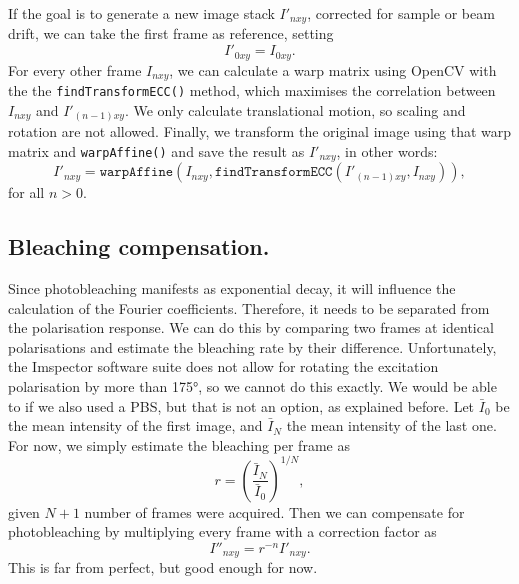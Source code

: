 If the goal is to generate a new image stack $ I'_{nxy} $, corrected for sample or beam drift, we can take the first frame as reference, setting 
\begin{equation}
	I'_{0xy} = I_{0xy}.
\end{equation}
For every other frame $ I_{nxy} $, we can calculate a warp matrix using OpenCV with the the \texttt{findTransformECC()} method, which maximises the correlation between $ I_{nxy} $ and $ I'_{(n-1)xy} $. We only calculate translational motion, so scaling and rotation are not allowed. Finally, we transform the original image using that warp matrix and \texttt{warpAffine()} and save the result as $ I'_{nxy} $, in other words:
\begin{equation}
	I'_{nxy} = \texttt{warpAffine}\left(
		I_{nxy}, 
		\texttt{findTransformECC}\left(I'_{(n-1)xy}, I_{nxy}\right)
	\right),
\end{equation}
for all $ n>0 $.

\subsection{Bleaching compensation.} Since photobleaching manifests as exponential decay, it will influence the calculation of the Fourier coefficients. Therefore, it needs to be separated from the polarisation response. We can do this by comparing two frames at identical polarisations and estimate the bleaching rate by their difference. Unfortunately, the Imspector software suite does not allow for rotating the excitation polarisation by more than \ang{175}, so we cannot do this exactly. We would be able to if we also used a PBS, but that is not an option, as explained before. Let $ \bar{I}_0 $ be the mean intensity of the first image, and $ \bar{I}_N $ the mean intensity of the last one. For now, we simply estimate the bleaching per frame as
\begin{equation}
	r = \left( \frac{\bar{I}_N}{\bar{I}_0} \right) ^{1/N},
\end{equation}
given $ N+1 $ number of frames were acquired. Then we can compensate for photobleaching by multiplying every frame with a correction factor as
\begin{equation}
	I''_{nxy} = r^{-n} I'_{nxy}.
\end{equation}
This is far from perfect, but good enough for now.

